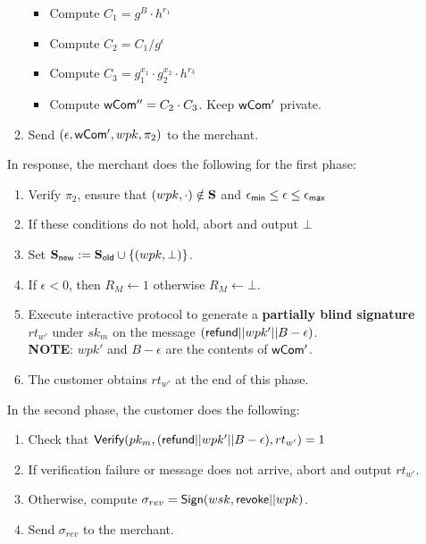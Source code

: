 \documentclass[11pt]{report}
\begin{document}
\begin{enumerate}
\begin{enumerate}
\begin{itemize}
\item Compute $C_1 = g^B \cdot h^{r_1}$
\item Compute $C_2 = C_1 / g^\epsilon$
\item Compute $C_3 = g_1^{x_1} \cdot g_2^{x_2} \cdot h^{r_3}$
\item Compute ${\sf wCom''} = C_2 \cdot C_3$. Keep ${\sf wCom'}$ private.
\end{itemize}
\item Send $(\epsilon, {\sf wCom'}, wpk, \pi_2)$ to the merchant.
\end{enumerate}

\medskip \noindent
In response, the merchant does the following for the first phase:
\begin{enumerate}
\item Verify $\pi_2$, ensure that $(wpk, \cdot) \notin {\bf S}$ and $\epsilon_{\sf min} \leq \epsilon \leq \epsilon_{\sf max}$
\item If these conditions do not hold, abort and output $\bot$
\item Set ${\bf S}_{\sf new} := {\bf S}_{\sf old} \cup \{(wpk, \bot)\}$.
\item If $\epsilon < 0$, then $R_{M} \leftarrow 1$ otherwise $R_{M} \leftarrow \bot$.
\item Execute interactive protocol to generate a {\bf partially blind signature} $rt_{w'}$ under $sk_m$ on the message $({\sf refund}||wpk'||B - \epsilon)$.
\\ {\bf NOTE}: $wpk'$ and $B - \epsilon$ are the contents of ${\sf wCom'}$.
\item The customer obtains $rt_{w'}$ at the end of this phase.
\end{enumerate}

\medskip \noindent
In the second phase, the customer does the following:
\begin{enumerate}
\item Check that ${\sf Verify}(pk_m, ({\sf refund}||wpk'||B - \epsilon), rt_{w'}) = 1$
\item If verification failure or message does not arrive, abort and output $rt_{w'}$.
\item Otherwise, compute $\sigma_{rev} = {\sf Sign}(wsk, {\sf revoke}||wpk)$.
\item Send $\sigma_{rev}$ to the merchant.
\end{enumerate}


\end{enumerate}
\end{document}
